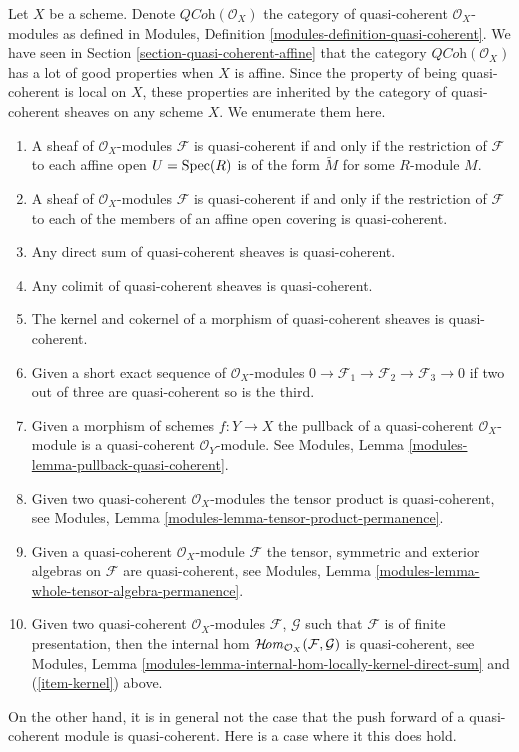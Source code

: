 \noindent
Let $X$ be a scheme. Denote $\textit{QCoh}(\mathcal{O}_X)$ the
category of quasi-coherent $\mathcal{O}_X$-modules as defined in
Modules, Definition \ref{modules-definition-quasi-coherent}.
We have seen in
Section \ref{section-quasi-coherent-affine}
that the category $\textit{QCoh}(\mathcal{O}_X)$ has a lot of good properties
when $X$ is affine. Since the property of being quasi-coherent is
local on $X$, these properties are inherited by the category
of quasi-coherent sheaves on any scheme $X$. We enumerate them here.
\begin{enumerate}
\item A sheaf of $\mathcal{O}_X$-modules $\mathcal{F}$ is
quasi-coherent if and only if the restriction of $\mathcal{F}$
to each affine open $U = \mathop{\rm Spec}(R)$ is of the form
$\widetilde M$ for some $R$-module $M$.
\item A sheaf of $\mathcal{O}_X$-modules $\mathcal{F}$ is
quasi-coherent if and only if the restriction of $\mathcal{F}$
to each of the members of an affine open covering is quasi-coherent.
\item Any direct sum of quasi-coherent sheaves is quasi-coherent.
\item Any colimit of quasi-coherent sheaves is quasi-coherent.
\item The kernel and cokernel of a morphism of quasi-coherent sheaves
is quasi-coherent.
\label{item-kernel}
\item Given a short exact sequence of $\mathcal{O}_X$-modules
$0 \to \mathcal{F}_1 \to \mathcal{F}_2 \to \mathcal{F}_3 \to 0$
if two out of three are quasi-coherent so is the third.
\item Given a morphism of schemes $f : Y \to X$ the pullback
of a quasi-coherent $\mathcal{O}_X$-module is a quasi-coherent
$\mathcal{O}_Y$-module. See
Modules, Lemma \ref{modules-lemma-pullback-quasi-coherent}.
\item Given two quasi-coherent $\mathcal{O}_X$-modules
the tensor product is quasi-coherent, see
Modules, Lemma \ref{modules-lemma-tensor-product-permanence}.
\item Given a quasi-coherent $\mathcal{O}_X$-module $\mathcal{F}$
the tensor, symmetric and exterior algebras on $\mathcal{F}$
are quasi-coherent, see
Modules, Lemma \ref{modules-lemma-whole-tensor-algebra-permanence}.
\item Given two quasi-coherent $\mathcal{O}_X$-modules
$\mathcal{F}$, $\mathcal{G}$ such that $\mathcal{F}$
is of finite presentation, then the internal hom
$\mathop{\mathcal{H}\!{\it om}}\nolimits_{\mathcal{O}_X}(\mathcal{F}, \mathcal{G})$
is quasi-coherent, see
Modules, Lemma \ref{modules-lemma-internal-hom-locally-kernel-direct-sum}
and (\ref{item-kernel}) above.
\end{enumerate}
On the other hand, it is in general not the case that the
push forward of a quasi-coherent module is quasi-coherent.
Here is a case where it this does hold.


